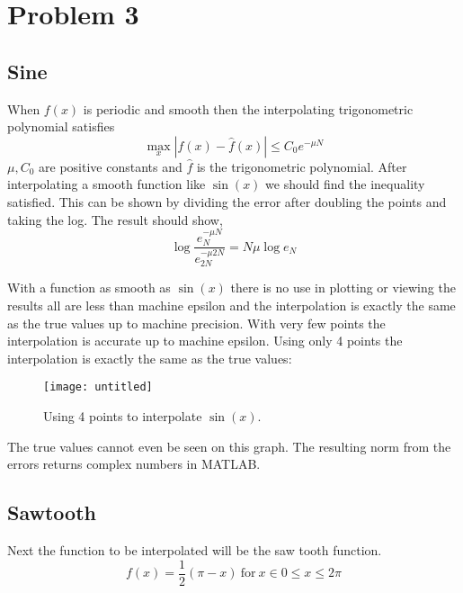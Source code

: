 \documentclass[]{article}
\begin{document}
\section*{Problem 3}
\subsection*{Sine}
When $ f(x) $ is  periodic and smooth then the interpolating trigonometric polynomial satisfies
\[
\max_x | f(x) - \hat{f}(x) | \leq C_0 e^{-\mu N}
\]
$ \mu, C_0  $	are positive constants and $ \hat{f}  $ is the trigonometric polynomial. After interpolating a smooth function like $ \sin(x) $ we should find the inequality satisfied. This can be shown by dividing the error after doubling the points and taking the log. The result should show, 
\[  
\log \frac{e_N^{-\mu N}}{e_{2N}^{-\mu 2N}} = N\mu \log e_N
\]

With a function as smooth as $ \sin(x) $ there is no use in plotting or viewing the results all are less than machine epsilon and the interpolation is exactly the same as the true values up to machine precision. With very few points the interpolation is accurate up to machine epsilon. Using only 4 points the interpolation is exactly the same as the true values:

\begin{figure}[H]
	\centering
	\texttt{[image: untitled]}
	\caption{Using 4 points to interpolate $ \sin(x) $.}
\end{figure}

The true values cannot even be seen on this graph. The resulting norm from the errors returns complex numbers in MATLAB. \\	

\subsection*{Sawtooth}
Next the function to be interpolated will be the saw tooth function. 
\[
f(x) = \frac{1}{2}(\pi -x) \ \text{for} \  x \in 0 \leq x \leq 2\pi
\]	
	
\end{document}

